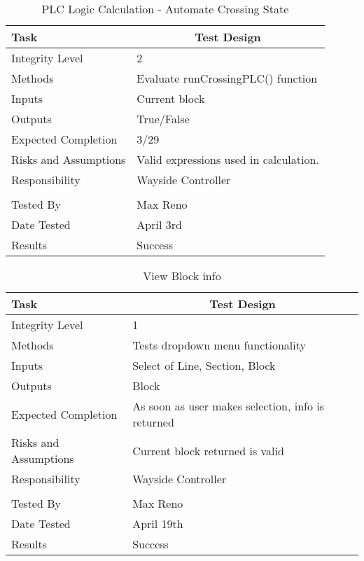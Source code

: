 \documentclass[]{article}
\begin{document}
\begin{table}[H]
	\centering
	\caption{PLC Logic Calculation - Automate Crossing State}
	\begin{tabular}{|l|l|}
		\hline
		Task & \multicolumn{1}{c|}{Test Design} \\ \hline
		Integrity Level & 2 \\ \hline
		Methods & Evaluate runCrossingPLC() function\\ \hline
		Inputs &  Current block \\ \hline
		Outputs &  True/False \\ \hline
		Expected Completion & 3/29\\ \hline
		Risks and Assumptions & \parbox[t]{10cm}{Valid expressions used in calculation.} \\ \hline
		Responsibility & Wayside Controller\\ \hline
		\\ \hline
		Tested By   &  Max Reno\\	\hline
		Date Tested & \parbox[t]{10cm}{April 3rd}\\ \hline
		Results & Success\\ \hline
	\end{tabular}
\end{table}

\begin{table}[H]
	\centering
	\caption{View Block info}
	\begin{tabular}{|l|l|}
		\hline
		Task & \multicolumn{1}{c|}{Test Design} \\ \hline
		Integrity Level & 1 \\ \hline
		Methods & Tests dropdown menu functionality\\ \hline
		Inputs &  Select of Line, Section, Block \\ \hline
		Outputs &  Block\\ \hline
		Expected Completion & As soon as user makes selection, info is returned\\ \hline
		Risks and Assumptions & \parbox[t]{10cm}{Current block returned is valid} \\ \hline
		Responsibility & Wayside Controller\\ \hline
		\\ \hline
		Tested By   &  Max Reno\\	\hline
		Date Tested & \parbox[t]{10cm}{April 19th}\\ \hline
		Results & Success\\ \hline
	\end{tabular}
\end{table}
\end{document}
